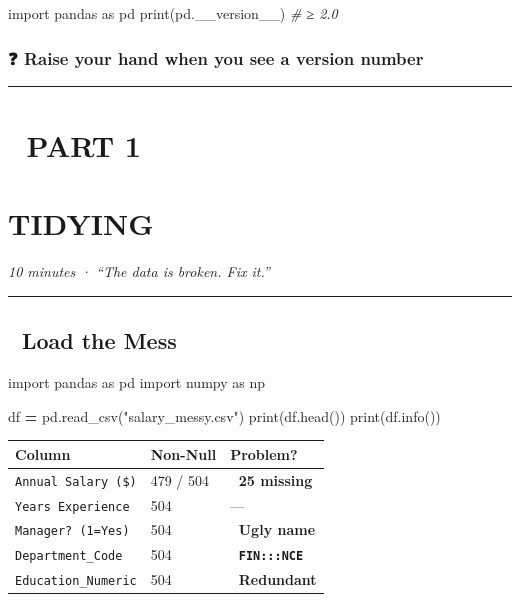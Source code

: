 \documentclass[
]{article}
\newenvironment{Shaded}{\begin{snugshade}}{\end{snugshade}}
\newcommand{\BuiltInTok}[1]{#1}
\newcommand{\CommentTok}[1]{\textcolor[rgb]{0.56,0.35,0.01}{\textit{#1}}}
\newcommand{\ImportTok}[1]{#1}
\newcommand{\NormalTok}[1]{#1}
\newcommand{\OperatorTok}[1]{\textcolor[rgb]{0.81,0.36,0.00}{\textbf{#1}}}
\newcommand{\StringTok}[1]{\textcolor[rgb]{0.31,0.60,0.02}{#1}}
\begin{document}
\begin{Shaded}
\begin{Highlighting}[]
\ImportTok{import}\NormalTok{ pandas }\ImportTok{as}\NormalTok{ pd}
\BuiltInTok{print}\NormalTok{(pd.\_\_version\_\_)          }\CommentTok{\# ≥ 2.0}
\end{Highlighting}
\end{Shaded}

\subsubsection{❓ Raise your hand when you see a version
number}\label{raise-your-hand-when-you-see-a-version-number}

\begin{center}\rule{0.5\linewidth}{0.5pt}\end{center}

\section{🧹 PART 1}\label{part-1}

\section{TIDYING}\label{tidying}

\emph{10 minutes · ``The data is broken. Fix it.''}

\begin{center}\rule{0.5\linewidth}{0.5pt}\end{center}

\subsection{📂 Load the Mess}\label{load-the-mess}

\begin{Shaded}
\begin{Highlighting}[]
\ImportTok{import}\NormalTok{ pandas }\ImportTok{as}\NormalTok{ pd}
\ImportTok{import}\NormalTok{ numpy }\ImportTok{as}\NormalTok{ np}

\NormalTok{df }\OperatorTok{=}\NormalTok{ pd.read\_csv(}\StringTok{"salary\_messy.csv"}\NormalTok{)}
\BuiltInTok{print}\NormalTok{(df.head())}
\BuiltInTok{print}\NormalTok{(df.info())}
\end{Highlighting}
\end{Shaded}

\begin{longtable}[]{@{}lll@{}}
\toprule\noalign{}
Column & Non-Null & Problem? \\
\midrule\noalign{}
\endhead
\bottomrule\noalign{}
\endlastfoot
\texttt{Annual\ Salary\ (\$)} & 479 / 504 & 🔴 \textbf{25 missing} \\
\texttt{Years\ Experience} & 504 & --- \\
\texttt{Manager?\ (1=Yes)} & 504 & 🔴 \textbf{Ugly name} \\
\texttt{Department\_Code} & 504 & 🔴 \textbf{\texttt{FIN:::NCE}} \\
\texttt{Education\_Numeric} & 504 & 🔴 \textbf{Redundant} \\
\end{longtable}
\end{document}
